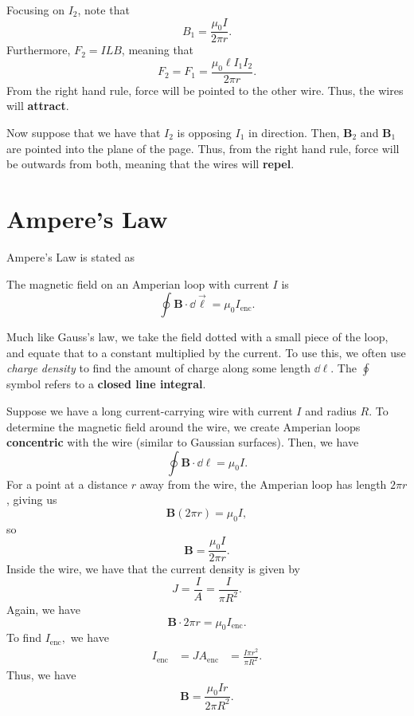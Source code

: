 \documentclass[11pt]{article}
\begin{document}
Focusing on $I_2$, note that
\begin{equation}
    B_1 = \frac{\mu_0 I}{2\pi r}.
\end{equation}
Furthermore, $F_2 = ILB$, meaning that
\begin{equation}
    F_2 = F_1 = \frac{\mu_0 \ell I_1I_2}{2\pi r}.
\end{equation}
From the right hand rule, force will be pointed to the other wire. Thus, the wires will \textbf{attract}.

Now suppose that we have that $I_2$ is opposing $I_1$ in direction. Then, $\mathbf{B}_2$ and $\mathbf{B}_1$ are pointed into the plane of the page. Thus, from the right hand rule, force will be outwards from both, meaning that the wires will \textbf{repel}.

\section{Ampere's Law}
Ampere's Law is stated as
\begin{thrm}
    The magnetic field on an Amperian loop with current $I$ is
    \begin{equation}
        \oint \mathbf{B} \cdot \dd \vec{\ell} = \mu_0 I_{\mathrm{enc}}.
    \end{equation}
\end{thrm}
Much like Gauss's law, we take the field dotted with a small piece of the loop, and equate that to a constant multiplied by the current. To use this, we often use \textit{charge density} to find the amount of charge along some length $\dd \ell$. The $\oint$ symbol refers to a \textbf{closed line integral}.

Suppose we have a long current-carrying wire with current $I$ and radius $R$. To determine the magnetic field around the wire, we create Amperian loops \textbf{concentric} with the wire (similar to Gaussian surfaces). Then, we have
\[\oint \mathbf{B} \cdot \dd \ell = \mu_0 I.\]
For a point at a distance $r$ away from the wire, the Amperian loop has length $2\pi r$, giving us
\[\mathbf{B}(2\pi r) = \mu_0 I,\]
so
\begin{equation}
    \mathbf{B} = \frac{\mu_0 I}{2\pi r}.
\end{equation}
Inside the wire, we have that the current density is given by
\[J = \frac{I}{A} = \frac{I}{\pi R^2}.\]
Again, we have
\[\mathbf{B} \cdot 2\pi r = \mu_0 I_{\mathrm{enc}}.\]
To find $I_{\mathrm{enc}},$ we have
\begin{align*}
    I_{\mathrm{enc}} &= JA_{\mathrm{enc}}
    &= \frac{I \pi r^2}{\pi R^2}.
\end{align*}
Thus, we have
\begin{equation}
    \mathbf{B} = \frac{\mu_0 I r}{2\pi R^2}.
\end{equation}
\end{document}
